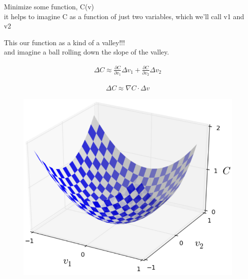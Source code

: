 \documentclass[10pt, compress]{beamer}
\begin{document}
\begin{frame}
   Minimize some function, C(v) \\
   it helps to imagine C as a function of just two variables, which we'll call v1 and v2

   \begin{multicols}{2}
     This our function as a kind of a valley!!! \\
     and imagine a ball rolling down the slope of the valley.

     \begin{eqnarray}
     \Delta C \approx \frac{\partial C}{\partial v_1} \Delta v_1 +
     \frac{\partial C}{\partial v_2} \Delta v_2
     \nonumber
     \end{eqnarray}

     \begin{eqnarray}
     \Delta C \approx \nabla C \cdot \Delta v
     \label{eq:2.8}
     \nonumber
     \end{eqnarray}


     \columnbreak
     \begin{figure}
       \includegraphics[width=1\linewidth]{imgs/gd_1}
     \end{figure}
  \end{multicols}
\end{frame}
\end{document}
